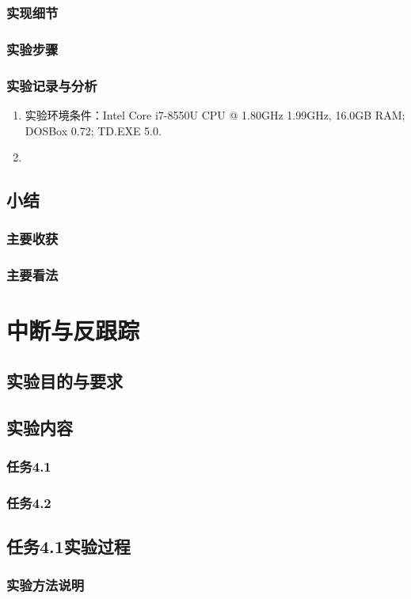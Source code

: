 \documentclass{ctexrep}
\begin{document}
\subsection{实现细节}
\subsection{实验步骤}
\subsection{实验记录与分析}
\begin{enumerate}
    \item 实验环境条件：Intel Core i7-8550U CPU @ 1.80GHz 1.99GHz, 16.0GB RAM; DOSBox 0.72; TD.EXE 5.0.
    \item 
\end{enumerate}
\section{小结}
\subsection{主要收获}
\subsection{主要看法}

\chapter{中断与反跟踪}
\section{实验目的与要求}
\section{实验内容}
\subsection{任务4.1}
\subsection{任务4.2}
\section{任务4.1实验过程}
\subsection{实验方法说明}
\end{document}
